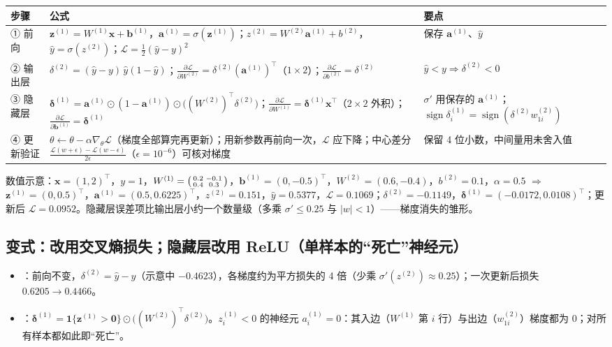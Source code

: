 \noindent\begin{tabularx}{\linewidth}{@{}p{1.6cm}p{8.6cm}L@{}}
\toprule
步骤 & 公式 & 要点 \\
\midrule
① 前向 & $\bm z^{(1)}=W^{(1)}\bm x+\bm b^{(1)}$，$\bm a^{(1)}=\sigma(\bm z^{(1)})$；$z^{(2)}=W^{(2)}\bm a^{(1)}+b^{(2)}$，$\hat y=\sigma(z^{(2)})$；$\mathcal L=\frac12(\hat y-y)^2$ & 保存 $\bm a^{(1)}$、$\hat y$ \\
② 输出层 & $\delta^{(2)}=(\hat y-y)\,\hat y(1-\hat y)$；$\frac{\partial\mathcal L}{\partial W^{(2)}}=\delta^{(2)}(\bm a^{(1)})^\top$（$1\times2$）；$\frac{\partial\mathcal L}{\partial b^{(2)}}=\delta^{(2)}$ & $\hat y<y\Rightarrow\delta^{(2)}<0$ \\
③ 隐藏层 & $\bm\delta^{(1)}=\bm a^{(1)}\odot(1-\bm a^{(1)})\odot\big((W^{(2)})^\top\delta^{(2)}\big)$；$\frac{\partial\mathcal L}{\partial W^{(1)}}=\bm\delta^{(1)}\bm x^\top$（$2\times2$ 外积）；$\frac{\partial\mathcal L}{\partial\bm b^{(1)}}=\bm\delta^{(1)}$ & $\sigma'$ 用保存的 $\bm a^{(1)}$；$\operatorname{sign}\delta^{(1)}_i=\operatorname{sign}(\delta^{(2)}w^{(2)}_{1i})$ \\
④ 更新验证 & $\theta\leftarrow\theta-\alpha\nabla_\theta\mathcal L$（梯度全部算完再更新）；用新参数再前向一次，$\mathcal L$ 应下降；中心差分 $\frac{\mathcal L(w+\epsilon)-\mathcal L(w-\epsilon)}{2\epsilon}$（$\epsilon=10^{-6}$）可核对梯度 & 保留 4 位小数，中间量用未舍入值 \\
\bottomrule
\end{tabularx}

\noindent 数值示意：$\bm x=(1,2)^\top$，$y=1$，$W^{(1)}=\begin{psmallmatrix}0.2&-0.1\\0.4&0.3\end{psmallmatrix}$，$\bm b^{(1)}=(0,-0.5)^\top$，$W^{(2)}=(0.6,-0.4)$，$b^{(2)}=0.1$，$\alpha=0.5$ $\Rightarrow$ $\bm z^{(1)}=(0,0.5)^\top$，$\bm a^{(1)}=(0.5,0.6225)^\top$，$z^{(2)}=0.151$，$\hat y=0.5377$，$\mathcal L=0.1069$；$\delta^{(2)}=-0.1149$，$\bm\delta^{(1)}=(-0.0172,0.0108)^\top$；更新后 $\mathcal L=0.0952$。隐藏层误差项比输出层小约一个数量级（多乘 $\sigma'\le0.25$ 与 $|w|<1$）——梯度消失的雏形。

\subsection{变式：改用交叉熵损失；隐藏层改用 ReLU（单样本的“死亡”神经元）}
\begin{itemize}
\item {}：前向不变，$\delta^{(2)}=\hat y-y$（示意中 $-0.4623$），各梯度约为平方损失的 4 倍（少乘 $\sigma'(z^{(2)})\approx0.25$）；一次更新后损失 $0.6205\to0.4466$。
\item {}：$\bm\delta^{(1)}=\mathbf 1\{\bm z^{(1)}>\bm 0\}\odot\big((W^{(2)})^\top\delta^{(2)}\big)$。$z^{(1)}_i<0$ 的神经元 $a^{(1)}_i=0$：其入边（$W^{(1)}$ 第 $i$ 行）与出边（$w^{(2)}_{1i}$）梯度都为 0；对所有样本都如此即“死亡”。
\end{itemize}

